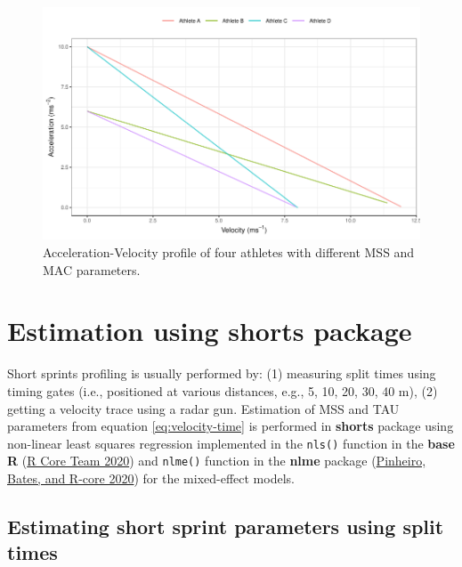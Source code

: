 \documentclass[fleqn,10pt,lineno]{wlpeerj} %
\begin{document}
\begin{figure}

{\centering \includegraphics[width=1\linewidth]{paper_files/figure-latex/four-athletes-profile-1} 

}

\caption{Acceleration-Velocity profile of four athletes with different MSS and MAC parameters.}\label{fig:four-athletes-profile}
\end{figure}

\hypertarget{estimation-using-shorts-package}{%
\section{Estimation using shorts package}\label{estimation-using-shorts-package}}

Short sprints profiling is usually performed by: (1) measuring split times using timing gates (i.e., positioned at various distances, e.g., 5, 10, 20, 30, 40 m), (2) getting a velocity trace using a radar gun. Estimation of MSS and TAU parameters from equation \eqref{eq:velocity-time} is performed in \textbf{shorts} package using non-linear least squares regression implemented in the \texttt{nls()} function in the \textbf{base R} (\protect\hyperlink{ref-R-base}{R Core Team 2020}) and \texttt{nlme()} function in the \textbf{nlme} package (\protect\hyperlink{ref-R-nlme}{Pinheiro, Bates, and R-core 2020}) for the mixed-effect models.

\hypertarget{estimating-short-sprint-parameters-using-split-times}{%
\subsection{Estimating short sprint parameters using split times}\label{estimating-short-sprint-parameters-using-split-times}}
\end{document}
